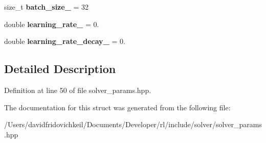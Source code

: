 \begin{DoxyCompactItemize}
size\+\_\+t {\bfseries batch\+\_\+size\+\_\+} = 32
\item 
\hypertarget{structrl_1_1_solver_params_ac9d7cbd3b11b63c3d80029286aba1e2a}{}\label{structrl_1_1_solver_params_ac9d7cbd3b11b63c3d80029286aba1e2a} 
double {\bfseries learning\+\_\+rate\+\_\+} = 0.
\item 
\hypertarget{structrl_1_1_solver_params_ad3f5f7c1763ea8da903c566f589bd4ff}{}\label{structrl_1_1_solver_params_ad3f5f7c1763ea8da903c566f589bd4ff} 
double {\bfseries learning\+\_\+rate\+\_\+decay\+\_\+} = 0.
\end{DoxyCompactItemize}


\subsection{Detailed Description}


Definition at line 50 of file solver\+\_\+params.\+hpp.



The documentation for this struct was generated from the following file\+:\begin{DoxyCompactItemize}
\item 
/\+Users/davidfridovichkeil/\+Documents/\+Developer/rl/include/solver/solver\+\_\+params.\+hpp\end{DoxyCompactItemize}
